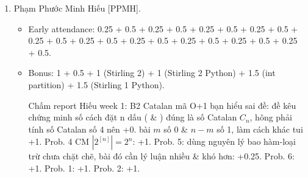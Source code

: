 \documentclass{article}
\begin{document}
\begin{enumerate}
\begin{itemize}
        Tới bài 26 p. 18
		\item Late: 24 + 20 + 10 + 70 mins.
        \item Midterm: 0.75.
	\end{itemize}
	\item {\sc Phạm Phước Minh Hiếu [PPMH].}
	\begin{itemize}
		\item Early attendance: 0.25 + 0.5 + 0.25 + 0.5 + 0.25 + 0.5 + 0.25 + 0.5 + 0.25 + 0.5 + 0.25 + 0.5 + 0.25 + 0.5 + 0.25 + 0.5 + 0.25 + 0.5 + 0.25 + 0.5.
		\item Bonus: 1 + 0.5 + 1 (Stirling 2) + 1 (Stirling 2 Python) + 1.5 (int partition) + 1.5 (Stirling 1 Python).

		Chấm report Hiếu week 1: B2 Catalan mã O+1 bạn hiểu sai đề: đề kêu chứng minh số cách đặt n dấu ( \& ) đúng là số Catalan $C_n$, hông phải tính số Catalan số 4 nên +0. bài $m$ số 0 \& $n - m$ số 1, làm cách khác tui +1. Prob. 4 CM $|2^{[n]}| =2^n$: +1. Prob. 5: dùng nguyên lý bao hàm-loại trừ chưa chặt chẽ, bài đó cần lý luận nhiều \& khó hơn: +0.25. Prob. 6: +1. Prob. 1: +1. Prob. 2: +1.


\end{itemize}
\end{enumerate}
\end{document}
